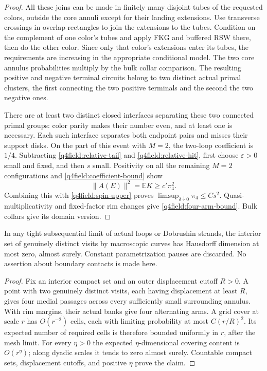 \begin{proof}
All these joins can be made in finitely many disjoint tubes of the
requested colors, outside the core annuli except for their landing
extensions.  Use transverse crossings in overlap rectangles to join
the extensions to the tubes.  Condition on the complement of one
color's tubes and apply FKG and buffered RSW there, then do the other
color.  Since only that color's extensions enter its tubes, the
requirements are increasing in the appropriate conditional model.
The two core annulus probabilities multiply by the bulk collar
comparison.  The resulting positive and negative terminal circuits
belong to two distinct actual primal clusters, the first connecting
the two positive terminals and the second the two negative ones.

There are at least two distinct closed interfaces separating these
two connected primal groups: color parity makes their number even,
and at least one is necessary.  Each such interface separates both
endpoint pairs and misses their support disks.  On the part of this
event with $M=2$, the two-loop coefficient is $1/4$.  Subtracting
\eqref{q4field:relative-tail} and \eqref{q4field:relative-hit}, first
choose $\varepsilon>0$ small and fixed, and then $s$ small.  Positivity
on all the remaining $M=2$ configurations and
\eqref{q4field:coefficient-bound} show
\[
 \|A(E)\|^2=\mathbb E K\ge c'\pi_4^2.
\]
Combining this with \eqref{q4field:spin-upper} proves
$\limsup_{\delta\downarrow0}\pi_4\le Cs^2$.
Quasi-multiplicativity and fixed-factor rim changes give
\eqref{q4field:four-arm-bound}.  Bulk collars give its domain version.
\end{proof}

\begin{corollary}\label{q4field:contact-dimension}
In any tight subsequential
limit of actual loops or Dobrushin strands, the interior set of
genuinely distinct visits by macroscopic curves has Hausdorff dimension
at most zero, almost surely.  Constant parametrization pauses are
discarded.  No assertion about boundary contacts is made here.
\end{corollary}

\begin{proof}
Fix an interior compact set and an outer displacement cutoff $R>0$.
A point with two genuinely distinct visits, each having displacement
at least $R$, gives four medial passages across every sufficiently
small surrounding annulus.  With rim margins, their actual banks
give four alternating arms.  A grid cover at scale $r$ has
$O(r^{-2})$ cells, each with limiting probability at most $C(r/R)^2$.
Its expected number of required cells is therefore bounded uniformly
in $r$, after the mesh limit.  For every $\eta>0$ the expected
$\eta$-dimensional covering content is $O(r^\eta)$; along dyadic
scales it tends to zero almost surely.  Countable compact sets,
displacement cutoffs, and positive $\eta$ prove the claim.
\end{proof}

